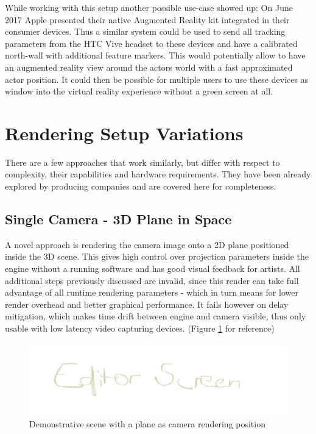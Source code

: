 While working with this setup another possible use-case showed up: On June 2017 
Apple presented their native Augmented Reality kit integrated in their consumer 
devices. Thus a similar system could be used to send all tracking parameters 
from the HTC Vive headset to these devices and have a calibrated north-wall 
with additional feature markers. This would potentially allow to have an 
augmented reality view around the actors world with a fast approximated actor 
position. It could then be possible for multiple users to use these devices as 
window into the virtual reality experience without a green screen at all.

\section{Rendering Setup Variations}

There are a few approaches that work similarly, but differ with respect to 
complexity, their capabilities and hardware requirements. They have been 
already explored by producing companies and are covered here for completeness.

\subsection{Single Camera - 3D Plane in Space}

A novel approach is rendering the camera image onto a 2D plane positioned 
inside the 3D scene. This gives high control over projection parameters inside 
the engine without a running software and has good visual feedback for artists. 
All additional steps previously discussed are invalid, since this render can 
take full advantage of all runtime rendering parameters - which in turn means 
for lower render overhead and better graphical performance. It fails however on 
delay mitigation, which makes time drift between engine and camera visible, 
thus only usable with low latency video capturing devices. (Figure 
\ref{fig:alt-render:single-camera} for reference)

\begin{figure}[htb]
	\includegraphics[width=\textwidth]{_raw_resources/editor_single_camera.png}
	\caption{Demonstrative scene with a plane as camera rendering position}
	\label{fig:alt-render:single-camera}
\end{figure}

